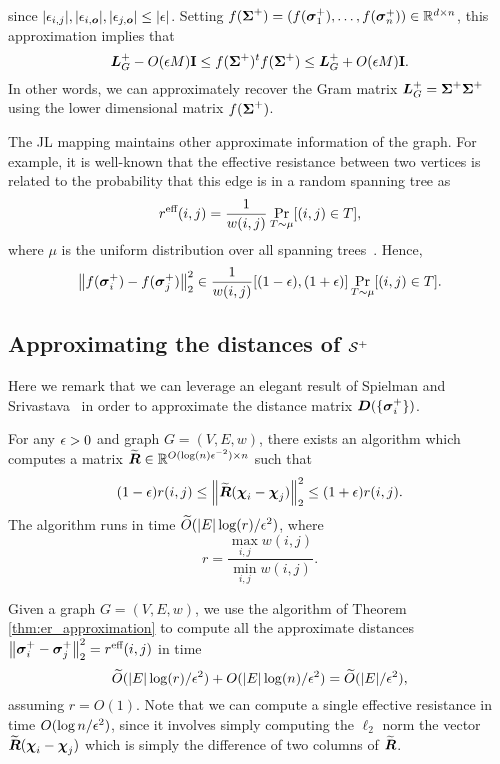 since $|\epsilon_{i,j}|, |\epsilon_{i,\vb*{o}}|,|\epsilon_{j,\vb*{o}}|\leq |\epsilon|$. Setting $f(\boldsymbol{\Sigma}^+) = (f(\vb*{\sigma}_1^+),\dots,f(\vb*{\sigma}_n^+))\in \mathbb{R}^{d\times n}$, this approximation implies that 
\begin{equation*}
\vb*{L}_G^+ - O(\epsilon M)\vb{I} \leq f(\boldsymbol{\Sigma}^+)^t f(\boldsymbol{\Sigma}^+) \leq \vb*{L}_G^+ + O(\epsilon M)\vb{I}. 
\end{equation*}
In other words, we can approximately recover the Gram matrix $\vb*{L}_G^+=\boldsymbol{\Sigma}^+\boldsymbol{\Sigma}^+$ using the lower dimensional matrix $f(\boldsymbol{\Sigma}^+)$. 

The JL mapping maintains other approximate information of the graph.  For  example,  it is well-known that the effective resistance between two vertices is related to the probability that this edge  is in a random  spanning  tree as 
\begin{equation*}
	r^{\text{eff}}(i,j) = \frac{1}{w(i,j)} \Pr_{T\sim \mu}[(i,j)\in T],
\end{equation*}
where $\mu$ is the uniform distribution over all spanning trees~\cite{burton1993local}. Hence, 
\begin{equation*}
\norm{f(\vb*{\sigma}_i^+)-f(\vb*{\sigma}_j^+)}_2^2 \in \frac{1}{w(i,j)}[(1-\epsilon),(1+\epsilon)]\Pr_{T\sim \mu}[(i,j)\in T].
\end{equation*}
	




\subsection{Approximating the  distances of \texorpdfstring{$\mathcal{S}^+$}{the inverse simplex}}
Here we  remark that we can leverage an elegant result of Spielman and Srivastava~\cite{spielman2011graph} in order to approximate  the distance matrix $\vb*{D}(\{\vb*{\sigma}_i^+\})$. 


\begin{theorem}
	\label{thm:er_approximation}
	For any $\epsilon>0$ and graph $G=(V,E,w)$, there exists an algorithm which computes a matrix $\widetilde{\vb*{R}}\in\mathbb{R}^{O(\log(n)\epsilon^{-2})\times n}$ such that 
	\begin{equation*}
	(1-\epsilon)r(i,j) \leq \norm{\widetilde{\vb*{R}}(\boldsymbol{\chi}_i-\boldsymbol{\chi}_j)}_2^2 \leq (1+\epsilon) r(i,j).
	\end{equation*}
	The algorithm runs in time $\widetilde{O}( |E|\log (r)/\epsilon^2)$, where 
	\[r=\frac{\max_{i,j}w(i,j)}{\min_{i,j}w(i,j)}.\]
\end{theorem}


Given a graph $G=(V,E,w)$, we use the algorithm of Theorem \ref{thm:er_approximation} to compute all the approximate distances $\norm{\vb*{\sigma}_i^+-\vb*{\sigma}_j^+}_2^2=r^{\text{eff}}(i,j)$ in time \[\widetilde{O}(|E|\log (r)/\epsilon^2)+O(|E| \log(n)/\epsilon^2)=\widetilde{O}(|E|/\epsilon^2),\]
assuming $r=O(1)$. Note that we can compute a single effective resistance in time $O(\log n/\epsilon^2)$, since it involves simply computing the $\ell_2$ norm the vector $\widetilde{\vb*{R}}(\boldsymbol{\chi}_i-\boldsymbol{\chi}_j)$ which is simply the difference of two columns of $\widetilde{\vb*{R}}$. 



